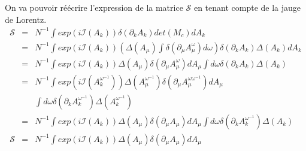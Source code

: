\documentclass[a4paper,11pt]{article}
\theoremstyle{plain}
\theoremstyle{definition}
\theoremstyle{remark}
\numberwithin{equation}{section}
\numberwithin{equation}{subsection}
\numberwithin{figure}{section}
\begin{document}
\noindent
On va pouvoir réécrire l'expression de la matrice $\mathcal{S}$ en tenant compte de la jauge de Lorentz.\\
\begin{eqnarray}
 \mathcal{S} &=& N^{-1} \int exp\left( i \mathcal{I}(A_{k}) \right) \delta(\partial_{k} A_{k} ) det(M_{c} ) dA_{k}\\
                       &=& N^{-1} \int exp\left( i \mathcal{I}(A_{k}) \right) 
\left( \Delta(A_{\mu})\int \delta \left(\partial_{\mu}A^{\omega}_{\mu}\right) d\omega \right) 
\delta(\partial_{k} A_{k} ) \Delta(A_{k}) dA_{k}\\
                      &=& N^{-1} \int exp\left( i \mathcal{I}(A_{k}) \right)
\Delta(A_{\mu}) \delta \left(\partial_{\mu}A^{\omega}_{\mu}\right) dA_{\mu} 
\int d\omega \delta(\partial_{k} A_{k} ) \Delta(A_{k}) \\ 
                      &=& N^{-1} \int exp\left( i \mathcal{I}(A^{\omega^{-1}}_{k}) \right)
\Delta(A^{\omega^{-1}}_{\mu}) \delta \left(\partial_{\mu}A^{\omega \omega^{-1}}_{\mu}\right) dA_{\mu} \nonumber \\
&& \int d\omega \delta(\partial_{k} A^{\omega^{-1}}_{k} ) \Delta(A^{\omega^{-1}}_{k}) \\ 
                       &=& N^{-1} \int exp\left( i \mathcal{I}(A_{k}) \right)
\Delta(A_{\mu}) \delta \left(\partial_{\mu}A_{\mu}\right) dA_{\mu} \int d\omega \delta(\partial_{k} A^{\omega^{-1}}_{k} ) \Delta(A_{k}) \\ 
 \mathcal{S} &=& N^{-1} \int exp\left( i \mathcal{I}(A_{k}) \right)
\Delta(A_{\mu}) \delta \left(\partial_{\mu}A_{\mu}\right) dA_{\mu} 
\end{eqnarray}
\end{document}
